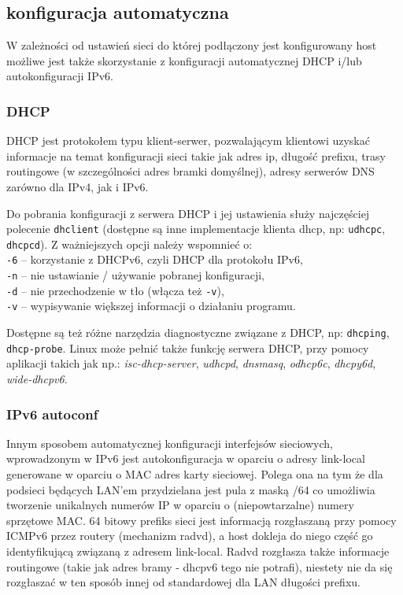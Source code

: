 \subsection{konfiguracja automatyczna}

W zależności od ustawień sieci do której podłączony jest konfigurowany host możliwe jest także skorzystanie z konfiguracji automatycznej DHCP i/lub autokonfiguracji IPv6.

\subsubsection{DHCP}

DHCP jest protokołem typu klient-serwer, pozwalającym klientowi uzyskać informacje na temat konfiguracji sieci takie jak adres ip, długość prefixu, trasy routingowe (w szczególności adres bramki domyślnej), adresy serwerów DNS zarówno dla IPv4, jak i IPv6.

Do pobrania konfiguracji z serwera DHCP i jej ustawienia służy najczęściej polecenie \Verb#dhclient# (dostępne są inne implementacje klienta dhcp, np: \Verb#udhcpc#, \Verb#dhcpcd#).
Z ważniejszych opcji należy wspomnieć o:\\
	\hspace*{1cm} \Verb#-6# – korzystanie z DHCPv6, czyli DHCP dla protokołu IPv6,\\
	\hspace*{1cm} \Verb#-n# – nie ustawianie / używanie pobranej konfiguracji,\\
	\hspace*{1cm} \Verb#-d# – nie przechodzenie w tło (włącza też \Verb#-v#),\\
	\hspace*{1cm} \Verb#-v# – wypisywanie większej informacji o działaniu programu.

Dostępne są też różne narzędzia diagnostyczne związane z DHCP, np: \Verb#dhcping#, \Verb#dhcp-probe#.
Linux może pełnić także funkcję serwera DHCP, przy pomocy aplikacji takich jak np.: 
	\textit{isc-dhcp-server}, \textit{udhcpd}, \textit{dnsmasq}, \textit{odhcp6c}, \textit{dhcpy6d}, \textit{wide-dhcpv6}.

\subsubsection{IPv6 autoconf}

Innym sposobem automatycznej konfiguracji interfejsów sieciowych, wprowadzonym w IPv6 jest autokonfiguracja w oparciu o adresy link-local generowane w oparciu o MAC adres karty sieciowej.
	Polega ona na tym że dla podsieci będących LAN'em przydzielana jest pula z maską /64 co umożliwia tworzenie unikalnych numerów IP w oparciu o (niepowtarzalne) numery sprzętowe MAC.
	64 bitowy prefiks sieci jest informacją rozgłaszaną przy pomocy ICMPv6 przez routery (mechanizm radvd), a host dokleja do niego część go identyfikującą związaną z adresem link-local.
	Radvd rozgłasza także informacje routingowe (takie jak adres bramy - dhcpv6 tego nie potrafi), niestety nie da się rozgłaszać w ten sposób innej od standardowej dla LAN długości prefixu.

